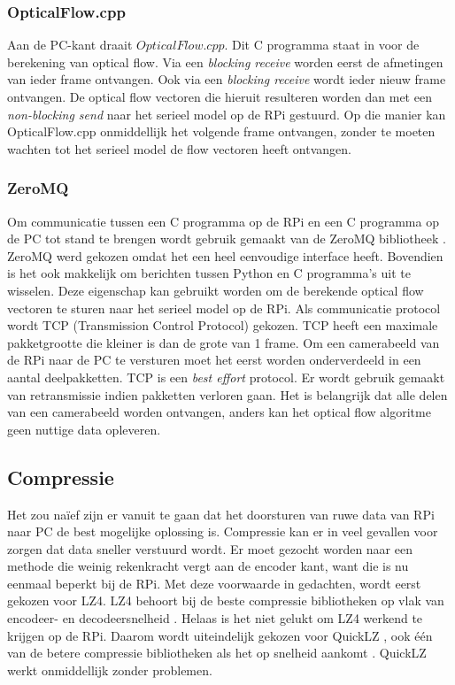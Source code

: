 \subsubsection{OpticalFlow.cpp}
Aan de PC-kant draait $OpticalFlow.cpp$. Dit C programma staat in voor de berekening van optical flow. Via een \textit{blocking receive} worden eerst de afmetingen van ieder frame ontvangen. Ook via een \textit{blocking receive} wordt ieder nieuw frame ontvangen. De optical flow vectoren die hieruit resulteren worden dan met een \textit{non-blocking send} naar het serieel model op de RPi gestuurd. Op die manier kan OpticalFlow.cpp onmiddellijk het volgende frame ontvangen, zonder te moeten wachten tot het serieel model de flow vectoren heeft ontvangen.

\subsubsection{ZeroMQ}
Om communicatie tussen een C programma op de RPi en een C programma op de PC tot stand te brengen wordt gebruik gemaakt van de ZeroMQ bibliotheek \cite{url:ZeroMQ}. ZeroMQ werd gekozen omdat het een heel eenvoudige interface heeft. Bovendien is het ook makkelijk om berichten tussen Python en C programma's uit te wisselen. Deze eigenschap kan gebruikt worden om de berekende optical flow vectoren te sturen naar het serieel model op de RPi. Als communicatie protocol wordt TCP (Transmission Control Protocol) gekozen. TCP heeft een maximale pakketgrootte die kleiner is dan de grote van 1 frame. Om een camerabeeld van de RPi naar de PC te versturen moet het eerst worden onderverdeeld in een aantal deelpakketten. TCP is een \textit{best effort} protocol. Er wordt gebruik gemaakt van retransmissie indien pakketten verloren gaan. Het is belangrijk dat alle delen van een camerabeeld  worden ontvangen, anders kan het optical flow algoritme geen nuttige data opleveren.

\subsection{Compressie}
Het zou na\"ief zijn er vanuit te gaan dat het doorsturen van ruwe data van RPi naar PC de best mogelijke oplossing is. Compressie kan er in veel gevallen voor zorgen dat data sneller verstuurd wordt. Er moet gezocht worden naar een methode die weinig rekenkracht vergt aan de encoder kant, want die is nu eenmaal beperkt bij de RPi. Met deze voorwaarde in gedachten, wordt eerst gekozen voor LZ4. LZ4 behoort bij de beste compressie bibliotheken op vlak van encodeer- en decodeersnelheid \cite{url:quicklzbench}. Helaas is het niet gelukt om LZ4 werkend te krijgen op de RPi. Daarom wordt uiteindelijk gekozen voor QuickLZ \cite{url:quicklz}, ook \'e\'en van de betere compressie bibliotheken als het op snelheid aankomt \cite{url:quicklzbench}. QuickLZ werkt onmiddellijk zonder problemen.

